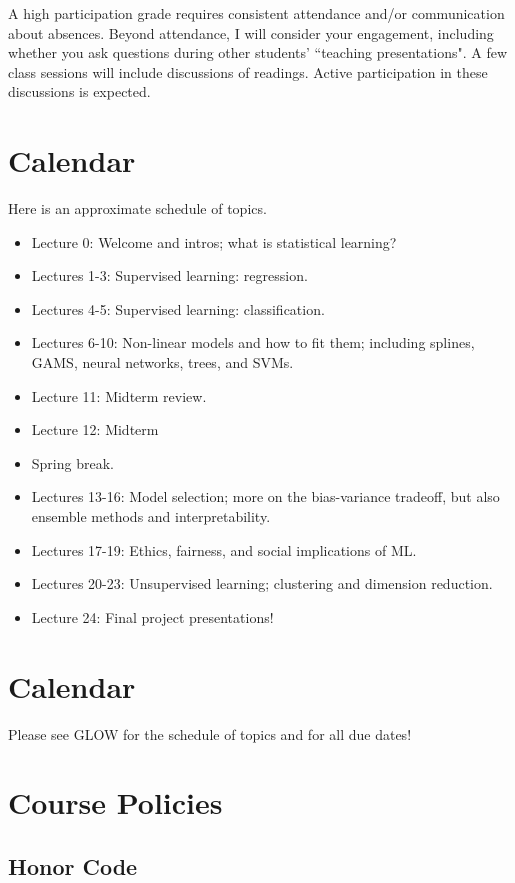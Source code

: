\documentclass[11pt]{article}
\begin{document}
A high participation grade requires consistent attendance and/or communication about absences. Beyond attendance, I will consider your engagement, including whether you ask questions during other students' ``teaching presentations". A few class sessions will include discussions of readings. Active participation in these discussions is expected. 

\section{Calendar}

Here is an approximate schedule of topics. 
\begin{itemize}
\item Lecture 0: Welcome and intros; what is statistical learning? 
\item Lectures 1-3: Supervised learning: regression. 
\item Lectures 4-5: Supervised learning: classification.
\item Lectures 6-10: Non-linear models and how to fit them; including splines, GAMS, neural networks, trees, and SVMs. 
\item Lecture 11: Midterm review.
\item Lecture 12: Midterm
\item Spring break. 
\item Lectures 13-16: Model selection; more on the bias-variance tradeoff, but also ensemble methods and interpretability. 
\item Lectures 17-19: Ethics, fairness, and social implications of ML.
\item Lectures 20-23: Unsupervised learning; clustering and dimension reduction. 
\item Lecture 24: Final project presentations!
\end{itemize}


\section{Calendar}

Please see GLOW for the schedule of topics and for all due dates! 

\section{Course Policies}

\subsection{Honor Code}
\end{document}
